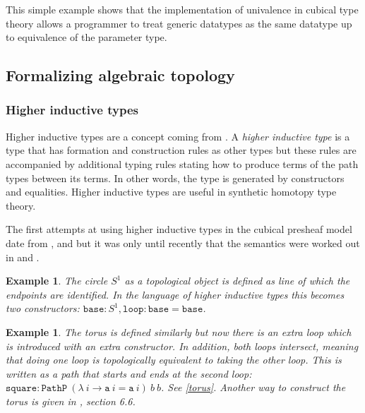 \documentclass[12pt,a4paper,twoside,xetex]{book}
\newcommand{\keyword}[1]{\emph{#1}\index{#1}}
\newtheorem{example}[theorem]{Example}
\newcommand{\op}[1]{\mathtt{#1}}
\begin{document}
This simple example shows that the implementation of univalence in cubical type 
theory allows a programmer to treat generic datatypes as the same datatype up 
to equivalence of the parameter type.

\subsection{Formalizing algebraic topology}

\subsubsection{Higher inductive types}\label{hit}

Higher inductive types are a concept coming from \cite{Voevodsky2013}. A 
\keyword{higher inductive type} is a type that has formation and construction 
rules  as other types but these rules are accompanied by additional typing 
rules stating how to produce terms of the path types between its terms. In 
other words, the type is generated by constructors and equalities. Higher 
inductive types are useful in synthetic homotopy type theory.

The first attempts at using higher inductive types in the cubical presheaf 
model date from \cite{Licata2015}, \cite{Huber2016} and \cite{Cohen2016} but it 
was only until recently that the semantics were worked out in \cite 
{Lumsdaine2017} and  \cite{Coquand2018}.



\begin{example}
The \keyword{circle} $S^1$ as a topological object is defined as line of which 
the endpoints are identified. In the language of higher inductive types this 
becomes two constructors: $\op{base} : S^1,  \op{loop} : \op{base} = \op{base}$.
\end{example}

\begin{example}
The \keyword{torus} is defined similarly but now there is an extra loop which is 
introduced with an extra constructor. In addition, both loops intersect, 
meaning that doing one loop is topologically equivalent to taking the other 
loop. This is written as a path that starts and ends at the second loop: 
$\op{square} : \op{PathP} \ (\lambda \ i \rightarrow \op{a} \ i = \op{a} \ i) \ 
b  \ b$. See \cref{torus}. Another way to construct the torus is given in 
\cite{Voevodsky2013}, section 6.6.
\end{example}
\end{document}
